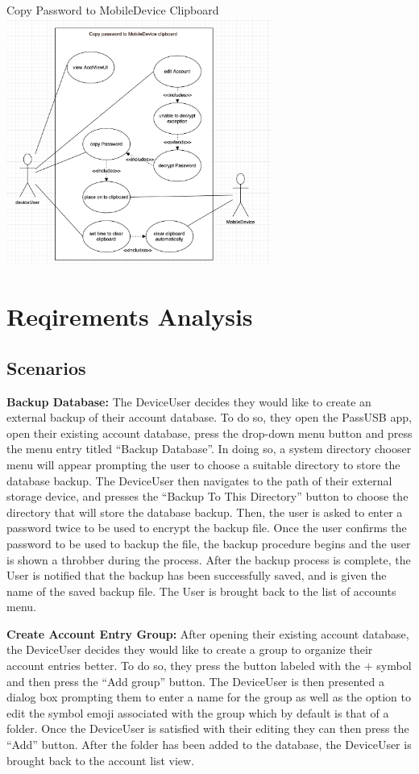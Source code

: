 \documentclass[stu]{apa7}
\begin{document}
Copy Password to MobileDevice Clipboard \\
\includegraphics[width=0.65\textwidth]{diag/rjm/uc2.png}

\section{Reqirements Analysis}

\subsection{Scenarios}

\textbf{Backup Database:} The DeviceUser decides they would like to create an external backup of their account database. To do so, they open the PassUSB app, open their existing account database, press the drop-down menu button and press the menu entry titled ``Backup Database''. In doing so, a system directory chooser menu will appear prompting the user to choose a suitable directory to store the database backup. The DeviceUser then navigates to the path of their external storage device, and presses the ``Backup To This Directory'' button to choose the directory that will store the database backup. Then, the user is asked to enter a password twice to be used to encrypt the backup file. Once the user confirms the password to be used to backup the file, the backup procedure begins and the user is shown a throbber during the process. After the backup process is complete, the User is notified that the backup has been successfully saved, and is given the name of the saved backup file. The User is brought back to the list of accounts menu.

\textbf{Create Account Entry Group:} After opening their existing account database, the DeviceUser decides they would like to create a group to organize their account entries better. To do so, they press the button labeled with the $+$ symbol and then press the ``Add group'' button. The DeviceUser is then presented a dialog box prompting them to enter a name for the group as well as the option to edit the symbol emoji associated with the group which by default is that of a folder. Once the DeviceUser is satisfied with their editing they can then press the ``Add''  button. After the folder has been added to the database, the DeviceUser is brought back to the account list view.
\end{document}

